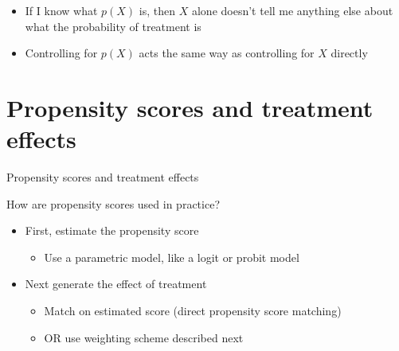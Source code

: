 \documentclass[compress, 8pt]{beamer}
\begin{document}
\begin{frame}{}

\begin{figure}
\end{figure}
\begin{itemize}
    \item If I know what $p(X)$ is, then $X$ alone doesn't tell me anything else about what the probability of treatment is
    \item Controlling for $p(X)$ acts the same way as controlling for $X$ directly
\end{itemize}

\end{frame}

\section[Treatment effects]{Propensity scores and treatment effects}
\miniframesoff
\begin{frame}
    \tableofcontents[currentsection]
\end{frame}
\miniframeson

\begin{frame}{Propensity scores and treatment effects}

How are propensity scores used in practice?
\begin{itemize}
    \item First, estimate the propensity score
    \begin{itemize}
        \item Use a parametric model, like a logit or probit model
    \end{itemize}
    \item Next generate the effect of treatment
    \begin{itemize}
        \item Match on estimated score (direct propensity score matching)
        \item OR use weighting scheme described next
    \end{itemize}
\end{itemize}

\end{frame}
\end{document}
